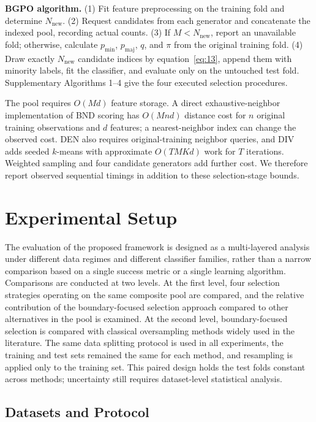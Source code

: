 \documentclass[pdflatex]{sn-jnl}
\begin{document}
\noindent\textbf{BGPO algorithm.} (1) Fit feature preprocessing on the training fold and determine \(N_{\mathrm{new}}\). (2) Request candidates from each generator and concatenate the indexed pool, recording actual counts. (3) If \(M<N_{\mathrm{new}}\), report an unavailable fold; otherwise, calculate \(p_{\min}\), \(p_{\mathrm{maj}}\), \(q\), and \(\pi\) from the original training fold. (4) Draw exactly \(N_{\mathrm{new}}\) candidate indices by equation~\eqref{eq:13}, append them with minority labels, fit the classifier, and evaluate only on the untouched test fold. Supplementary Algorithms 1--4 give the four executed selection procedures.

The pool requires \(O(Md)\) feature storage. A direct exhaustive-neighbor implementation of BND scoring has \(O(Mnd)\) distance cost for \(n\) original training observations and \(d\) features; a nearest-neighbor index can change the observed cost. DEN also requires original-training neighbor queries, and DIV adds seeded \(k\)-means with approximate \(O(TMKd)\) work for \(T\) iterations. Weighted sampling and four candidate generators add further cost. We therefore report observed sequential timings in addition to these selection-stage bounds.


\section{Experimental Setup}\label{sec:4}

The evaluation of the proposed framework is designed as a multi-layered analysis under different data regimes and different classifier families, rather than a narrow comparison based on a single success metric or a single learning algorithm. Comparisons are conducted at two levels. At the first level, four selection strategies operating on the same composite pool are compared, and the relative contribution of the boundary-focused selection approach compared to other alternatives in the pool is examined. At the second level, boundary-focused selection is compared with classical oversampling methods widely used in the literature. The same data splitting protocol is used in all experiments, the training and test sets remained the same for each method, and resampling is applied only to the training set. This paired design holds the test folds constant across methods; uncertainty still requires dataset-level statistical analysis.

\subsection{Datasets and Protocol}
\end{document}
